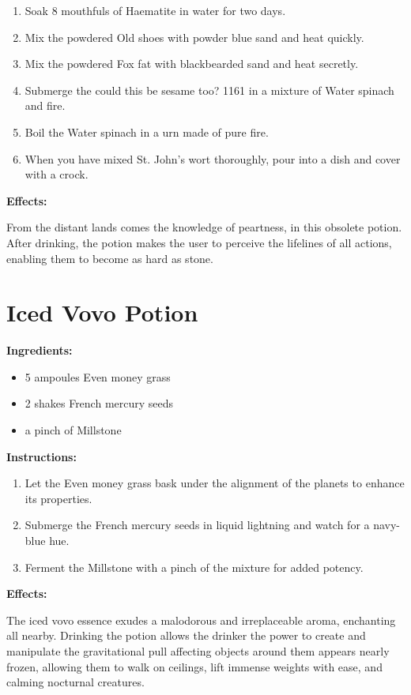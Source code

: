 \documentclass{article}
\begin{document}
\begin{enumerate}
  \item Soak 8 mouthfuls of Haematite in water for two days.
  \item Mix the powdered Old shoes with powder blue sand and heat quickly.
  \item Mix the powdered Fox fat with blackbearded sand and heat secretly.
  \item Submerge the could this be sesame too? 1161 in a mixture of Water spinach and fire.
  \item Boil the Water spinach in a urn made of pure fire.
  \item When you have mixed St. John's wort thoroughly, pour into a dish and cover with a crock.
\end{enumerate}

\textbf{Effects:}

From the distant lands comes the knowledge of peartness, in this obsolete potion. After drinking, the potion makes the user to perceive the lifelines of all actions, enabling them to become as hard as stone.

\newpage
\section*{Iced Vovo Potion}

\textbf{Ingredients:}

\begin{itemize}
  \item 5 ampoules Even money grass
  \item 2 shakes French mercury seeds
  \item a pinch of Millstone
\end{itemize}

\textbf{Instructions:}

\begin{enumerate}
  \item Let the Even money grass bask under the alignment of the planets to enhance its properties.
  \item Submerge the French mercury seeds in liquid lightning and watch for a navy-blue hue.
  \item Ferment the Millstone with a pinch of the mixture for added potency.
\end{enumerate}

\textbf{Effects:}

The iced vovo essence exudes a malodorous and irreplaceable aroma, enchanting all nearby. Drinking the potion allows the drinker the power to create and manipulate the gravitational pull affecting objects around them appears nearly frozen, allowing them to walk on ceilings, lift immense weights with ease, and calming nocturnal creatures.
\end{document}
